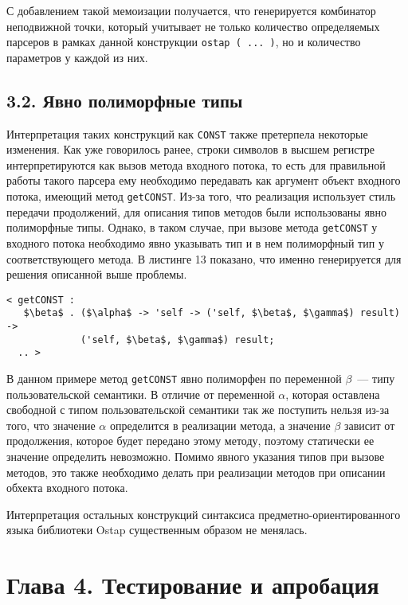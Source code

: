 С добавлением такой мемоизации получается, что генерируется комбинатор неподвижной точки, который учитывает не только количество определяемых парсеров в рамках данной конструкции \lstinline|ostap ( ... )|, но и количество параметров у каждой из них.

\subsection*{3.2. Явно полиморфные типы}

Интерпретация таких конструкций как \lstinline|CONST| также претерпела некоторые изменения. Как уже говорилось ранее, строки символов в высшем регистре интерпретируются как вызов метода входного потока, то есть для правильной работы такого парсера ему необходимо передавать как аргумент объект входного потока, имеющий метод \lstinline|getCONST|. Из-за того, что реализация использует стиль передачи продолжений, для описания типов методов были использованы явно полиморфные типы. Однако, в таком случае, при вызове метода \lstinline|getCONST| у входного потока необходимо явно указывать тип и в нем полиморфный тип у соответствующего метода. В листинге 13 показано, что именно генерируется для решения описанной выше проблемы.

\begin{lstlisting}[basicstyle=\small, caption=Генерируемый код для конструкции CONST]
< getCONST :
   $\beta$ . ($\alpha$ -> 'self -> ('self, $\beta$, $\gamma$) result) ->
             ('self, $\beta$, $\gamma$) result;
  .. >
\end{lstlisting}

В данном примере метод \lstinline|getCONST| явно полиморфен по переменной $\beta$~--- типу пользовательской семантики. В отличие от переменной $\alpha$, которая оставлена свободной с типом пользовательской семантики так же поступить нельзя из-за того, что значение $\alpha$ определится в реализации метода, а значение $\beta$ зависит от продолжения, которое будет передано этому методу, поэтому статически ее значение определить невозможно. Помимо явного указания типов при вызове методов, это также необходимо делать при реализации методов при описании обхекта входного потока.

Интерпретация остальных конструкций синтаксиса предметно-ориентированного языка библиотеки Ostap существенным образом не менялась.

\section*{Глава 4. Тестирование и апробация}

